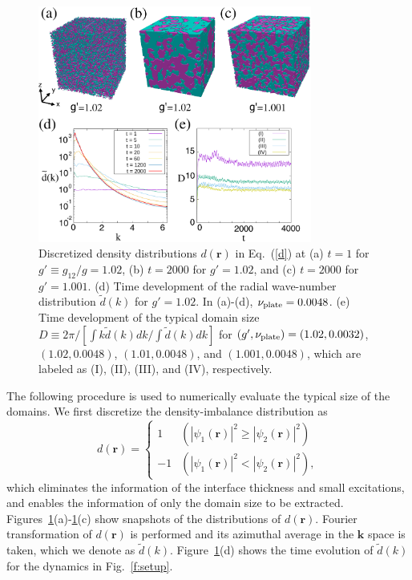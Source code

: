 \documentclass[pra,aps,superscriptaddress,twocolumn]{revtex4-2}
\begin{document}
\begin{figure}[t]
	\includegraphics[width=9cm]{fig2.eps}
	\caption{
		Discretized density distributions $d(\bm{r})$ in Eq.~(\ref{d}) at
    (a) $t = 1$ for $g' \equiv g_{12} / g = 1.02$,
    (b) $t = 2000$ for $g' = 1.02$, and
		(c) $t = 2000$ for $g' = 1.001$.	
	  (d) Time development of the radial wave-number distribution
    $\tilde d(k)$ for $g' = 1.02$.
    In (a)-(d), $\nu_{\rm plate} = 0.0048$.
		(e) Time development of the typical domain size $D \equiv 2\pi / [\int k
      \tilde d(k) dk / \int \tilde d(k) dk]$ for $(g', \nu_{\rm plate}) =
    (1.02, 0.0032)$, $(1.02, 0.0048)$, $(1.01, 0.0048)$, and
    $(1.001, 0.0048)$, which are labeled as (I), (II), (III), and (IV),
    respectively.
	}
	\label{f:arrest}
\end{figure}
The following procedure is used to numerically evaluate the typical size of
the domains.
We first discretize the density-imbalance distribution as
\begin{equation} \label{d}
  d(\bm{r}) = \left\{
  \begin{array}{ll}
    1 & (|\psi_1(\bm{r})|^2 \geq |\psi_2(\bm{r})|^2) \\
    -1 & (|\psi_1(\bm{r})|^2 < |\psi_2(\bm{r})|^2),
  \end{array} \right.
\end{equation}
which eliminates the information of the interface thickness and small
excitations, and enables the information of only the domain size to be
extracted.
Figures~\ref{f:arrest}(a)-\ref{f:arrest}(c) show snapshots of the
distributions of $d(\bm{r})$.
Fourier transformation of $d(\bm{r})$ is performed and its azimuthal average
in the $\bm{k}$ space is taken, which we denote as $\tilde d(k)$.
Figure~\ref{f:arrest}(d) shows the time evolution of $\tilde d(k)$ for the
dynamics in Fig.~\ref{f:setup}.
\end{document}
